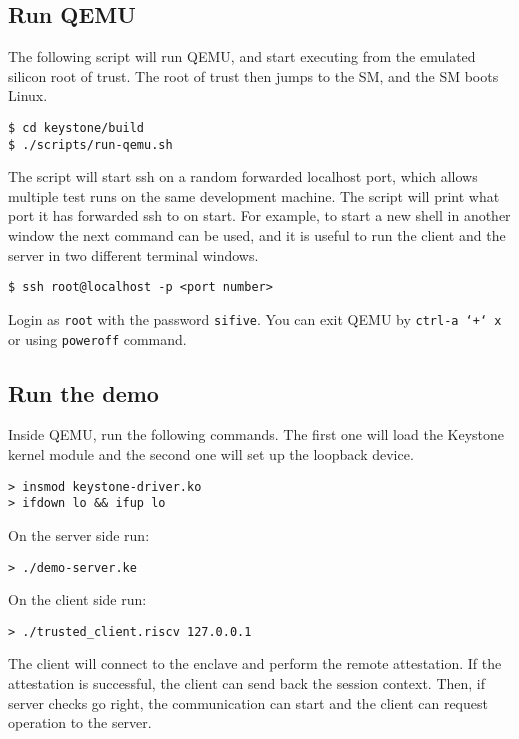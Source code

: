 \subsection{Run QEMU}
The following script will run QEMU, and start executing from the emulated silicon root of trust. The root of trust then jumps to the SM, and the SM boots Linux. \\
\begin{lstlisting}[style=terminal,frame=single]
$ cd keystone/build
$ ./scripts/run-qemu.sh
\end{lstlisting}
The script will start ssh on a random forwarded localhost port, which allows multiple test runs on the same development machine. The script will print what port it has forwarded ssh to on start. For example, to start a new shell in another window the next command can be used, and it is useful to run the client and the server in two different terminal windows. \\
\begin{lstlisting}[style=terminal,frame=single]
$ ssh root@localhost -p <port number>
\end{lstlisting}
Login as \texttt{\color{RedOrange}root} with the password \texttt{\color{RedOrange}sifive}. You can exit QEMU by \texttt{\color{RedOrange}ctrl-a\ `+`\ x} or using  \texttt{\color{RedOrange}poweroff}  command.

\subsection{Run the demo}
Inside QEMU, run the following commands. The first one will load the Keystone kernel module and the second one will set up the loopback device. \\
\begin{lstlisting}[style=terminal,frame=single]
> insmod keystone-driver.ko 
> ifdown lo && ifup lo           
\end{lstlisting}
On the server side run: \\
\begin{lstlisting}[style=terminal,frame=single]
> ./demo-server.ke         
\end{lstlisting}
On the client side run: \\
\begin{lstlisting}[style=terminal,frame=single]
> ./trusted_client.riscv 127.0.0.1        
\end{lstlisting}
The client will connect to the enclave and perform the remote attestation. If the attestation is successful, the client can send back the session context. Then, if server checks go right, the communication can start and the client can request operation to the server. 

